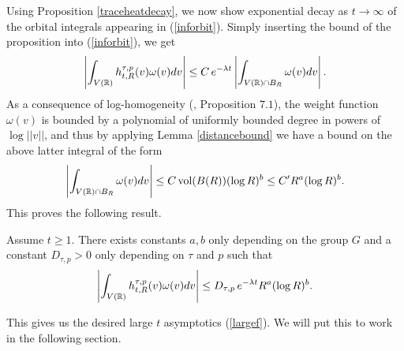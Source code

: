 Using Proposition \ref{traceheatdecay}, we now show exponential decay as $t\to\infty$ of the orbital integrals appearing in (\ref{inforbit}). Simply inserting the bound of the proposition into (\ref{inforbit}), we get
\begin{align*}
    \left\vert\int_{V(\mathbb{R})}h^{\tau,p}_{t,R}(v)\omega(v)dv\right\vert \leq C\,e^{-\lambda t}\left\vert\int_{V(\mathbb{R})\cap B_R}\omega(v)dv\right\vert.
\end{align*}
As a consequence of log-homogeneity (\cite{MzM1}, Proposition $7.1$), the weight function $\omega(v)$ is bounded by a polynomial of uniformly bounded degree in powers of $\log||v||$, and thus by applying Lemma \ref{distancebound} we have a bound on the above latter integral of the form
\begin{align*}
    \left\vert\int_{V(\mathbb{R})\cap B_R}\omega(v)dv\right\vert \leq C \operatorname{vol}(B(R)) (\log R)^b \leq C' R^a(\log R)^b.
\end{align*}
This proves the following result.
\begin{prop}\label{orbitasymp}
    Assume $t\geq 1$. There exists constants $a,b$ only depending on the group $G$ and a constant $D_{\tau,p}>0$ only depending on $\tau$ and $p$ such that
    \begin{align*}
        \left\vert\int_{V(\mathbb{R})}h^{\tau,p}_{t,R}(v)\omega(v)dv\right\vert \leq D_{\tau,p} \,e^{-\lambda t}R^a(\log R)^b.
    \end{align*}
\end{prop}
\noindent This gives us the desired large $t$ asymptotics (\ref{largef}). We will put this to work in the following section.

